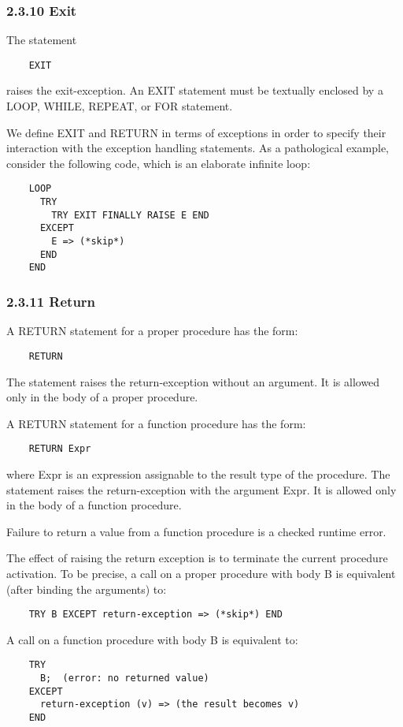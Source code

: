 \documentclass[10pt]{article}
\begin{document}
 
\subsubsection*{2.3.10 Exit}


  The statement 
\begin{verbatim}
    EXIT
\end{verbatim}
 raises the exit-exception. An EXIT statement must be textually enclosed by a LOOP, WHILE, REPEAT, or FOR statement. 


 We define EXIT and RETURN in terms of exceptions in order to specify their interaction with the exception handling statements. As a pathological example, consider the following code, which is an elaborate infinite loop: 
\begin{verbatim}
    LOOP
      TRY
        TRY EXIT FINALLY RAISE E END
      EXCEPT
        E => (*skip*)
      END
    END
\end{verbatim}



 
\subsubsection*{2.3.11 Return}


  A RETURN statement for a proper procedure has the form: 
\begin{verbatim}
    RETURN
\end{verbatim}
 The statement raises the return-exception without an argument. It is allowed only in the body of a proper procedure. 


 A RETURN statement for a function procedure has the form: 
\begin{verbatim}
    RETURN Expr
\end{verbatim}
 where Expr is an expression assignable to the result type of the procedure. The statement raises the return-exception with the argument Expr. It is allowed only in the body of a function procedure. 


 Failure to return a value from a function procedure is a checked runtime error. 


  The effect of raising the return exception is to terminate the current procedure activation. To be precise, a call on a proper procedure with body B is equivalent (after binding the arguments) to: 
\begin{verbatim}
    TRY B EXCEPT return-exception => (*skip*) END
\end{verbatim}
 A call on a function procedure with body B is equivalent to: 
\begin{verbatim}
    TRY 
      B;  (error: no returned value)  
    EXCEPT 
      return-exception (v) => (the result becomes v)  
    END
\end{verbatim}
\end{document}
